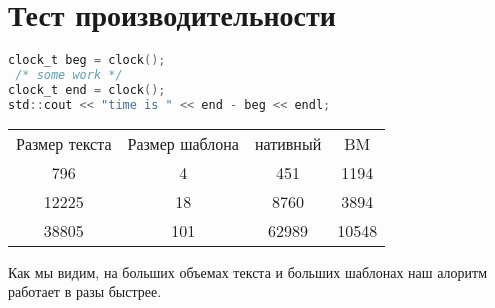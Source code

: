 \section{Тест производительности}
\begin{lstlisting}[language=C]
clock_t beg = clock();
 /* some work */
clock_t end = clock();
std::cout << "time is " << end - beg << endl;
\end{lstlisting}

\begin{center}
\begin{table}[h]

\label{tabular:timesandtenses}

\begin{tabular}{c|c|c|c}
Размер текста & Размер шаблона & нативный & BM\\

796 & 4 & 451 & 1194\\
12225 & 18 & 8760 & 3894\\
38805 & 101 & 62989 & 10548\\
\end{tabular}
\end{table}
\end{center}
Как мы видим, на больших объемах текста и больших шаблонах наш алоритм работает в разы быстрее.


 
\pagebreak
